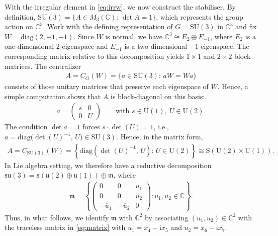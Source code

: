 \documentclass[11pt]{amsart}
\theoremstyle{definition}
\theoremstyle{plain}
\theoremstyle{conclusion}
\begin{document}
With the irregular element in \eqref{eq:irrw}, we now construct the stabiliser. By definition, $\mathrm{SU}(3) = \{A \in M_3(\mathbb{C}):\, \det A = 1 \}$, which represents the group action on $\mathbb{C}^3$.   Work with the defining representation of $G=\mathrm{SU}(3)$ in $\mathbb{C}^3$ and fix $W=\mathrm{diag}(2,-1,-1)$. Since $W$ is normal, we have $\mathbb{C}^3 \cong E_2 \oplus E_{-1}$, where $E_2$ is a one-dimensional $2$-eigenspace and $E_{-1}$ is a two dimensional $-1$-eigenspace. The corresponding matrix relative to this decomposition yields $1\times 1$ and $2\times 2$ block matrices. The centralizer \begin{align*}
A=C_G(W)=\{a\in \mathrm{SU}(3):\, aW=Wa\}
\end{align*} consists of those unitary matrices that preserve each eigenspace of $W$. Hence, a simple computation shows that $A$ is block-diagonal on this basis: \begin{align}
a=\begin{pmatrix} s & 0\\[2pt] 0 & U\end{pmatrix}\qquad\text{with }s\in \mathrm{U}(1),\ U\in \mathrm{U}(2). \label{eq:generatora}
\end{align} The condition $\det a=1$ forces $s\cdot \det(U)=1$, i.e., $a=\mathrm{diag}\bigl(\det(U)^{-1},\,U\bigr)\in \mathrm{SU}(3)$. Hence, in the matrix form,  \begin{align*}
    A = C_{\mathrm{SU}(3)}(W) = \left\{\mathrm{diag}\left(\det(U)^{-1},\,U\right): \, U \in \mathrm{U}(2)\right\} \cong \mathrm{S}(\mathrm{U}(2) \times \mathrm{U}(1)).
\end{align*}  In Lie algebra setting, we therefore have a reductive decomposition $\mathfrak{su}(3)=\mathfrak{s}(\mathfrak{u}(2)\oplus\mathfrak{u}(1))\oplus \mathfrak{m}$, where \begin{align}
    \mathfrak{m}=\left\{\begin{pmatrix}
    0&0&u_1\\
    0&0&u_2\\
    -\overline{u}_1&-\overline{u}_2&0\end{pmatrix}: u_1,u_2\in\mathbb{C}\right\}. \label{eq:matrix}
\end{align} Thus, in what follows, we identify $\mathfrak{m}$ with $\mathbb{C}^2$ by associating $(u_1,u_2) \in \mathbb{C}^2$ with the traceless matrix in \eqref{eq:matrix} with $u_1 = x_4  - \mathrm{i} x_5$ and $u_2 = x_6 - \mathrm{i} x_7$.
\end{document}
